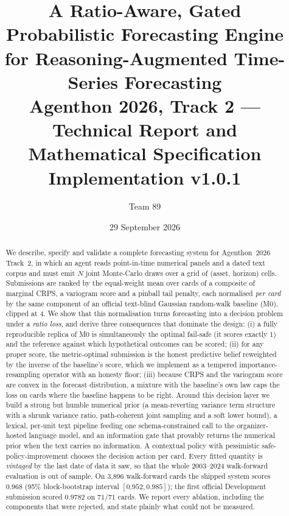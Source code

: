 \documentclass[11pt,a4paper]{article}
\title{\textbf{A Ratio-Aware, Gated Probabilistic Forecasting Engine\\for Reasoning-Augmented Time-Series Forecasting}\\[4pt]
\large Agenthon 2026, Track 2 --- Technical Report and Mathematical Specification\\
\normalsize Implementation \code{agenthon-track2} v1.0.1}
\author{Team 89}
\date{29 September 2026}
\numberwithin{equation}{section}
\theoremstyle{definition}
\theoremstyle{remark}
\begin{document}
\maketitle

\begin{abstract}
\noindent
We describe, specify and validate a complete forecasting system for Agenthon~2026 Track~2, in which an agent reads point-in-time
numerical panels and a dated text corpus and must emit $N$ joint Monte-Carlo draws over a grid of (asset, horizon) cells.
Submissions are ranked by the equal-weight mean over cards of a composite of marginal CRPS, a variogram score and a pinball tail
penalty, each normalised \emph{per card} by the same component of an official text-blind Gaussian random-walk baseline (M0),
clipped at $4$. We show that this normalisation turns forecasting into a decision problem under a \emph{ratio loss}, and derive
three consequences that dominate the design: (i) a fully reproducible replica of M0 is simultaneously the optimal fail-safe
(it scores exactly $1$) and the reference against which hypothetical outcomes can be scored; (ii) for any proper score, the
metric-optimal submission is the honest predictive belief reweighted by the inverse of the baseline's score, which we implement as
a tempered importance-resampling operator with an honesty floor; (iii) because CRPS and the variogram score are convex in the
forecast distribution, a mixture with the baseline's own law caps the loss on cards where the baseline happens to be right.
Around this decision layer we build a strong but humble numerical prior (a mean-reverting variance term structure with a shrunk
variance ratio, path-coherent joint sampling and a soft lower bound), a lexical, per-unit text pipeline feeding one
schema-constrained call to the organizer-hosted language model, and an information gate that provably returns the numerical prior
when the text carries no information. A contextual policy with pessimistic safe-policy-improvement chooses the decision action per
card. Every fitted quantity is \emph{vintaged} by the last date of data it saw, so that the whole 2003--2024 walk-forward evaluation
is out of sample. On 3{,}896 walk-forward cards the shipped system scores $0.968$ (95\% block-bootstrap interval $[0.952,0.985]$);
the first official Development submission scored $0.9782$ on $71/71$ cards. We report every ablation, including the components that
were rejected, and state plainly what could not be measured.
\end{abstract}

\tableofcontents
\newpage















\appendix




\end{document}
